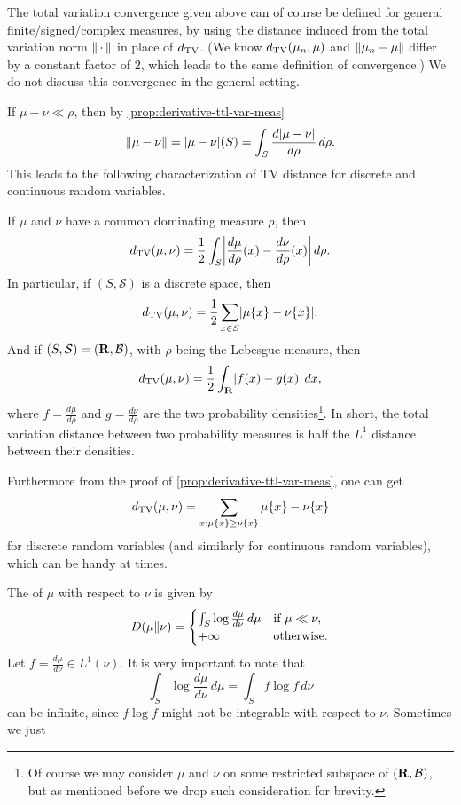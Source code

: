 The total variation convergence given above can of course be defined for general finite/signed/complex measures, by using the distance induced from the total variation norm $\lVert \,\cdot\, \rVert$ in place of $d_{\mathrm{TV}}$. (We know $d_{\mathrm{TV}}(\mu_n,\mu)$ and $\lVert \mu_n-\mu \rVert$ differ by a constant factor of $2$, which leads to the same definition of convergence.) We do not discuss this convergence in the general setting.


If $\mu - \nu \ll \rho$, then by \cref{prop:derivative-ttl-var-meas} \[\lVert \mu - \nu \rVert = \lvert \mu - \nu \rvert(S) = \int_S\frac{d\lvert \mu - \nu \rvert}{d\rho}\,d\rho.\] This leads to the following characterization of TV distance for discrete and continuous random variables.
\begin{fact}
    If $\mu$ and $\nu$ have a common dominating measure $\rho$, then \begin{equation}
        \tv(\mu,\nu) = \frac{1}{2} \int_{S} \biggl\vert\frac{d\mu}{d\rho}(x) - \frac{d\nu}{d\rho}(x)\biggr\vert\,d\rho. \label{eq:tv-dominating-expression}
    \end{equation}
    In particular, if $(S,\mathcal S)$ is a discrete space, then \[d_{\mathrm{TV}}(\mu,\nu) = \frac{1}{2}\sum_{x \in S} \lvert \mu\{x\} - \nu\{x\} \rvert.\] And if $(S,\mathcal S) = (\mathbf{R},\mathcal{B})$, with $\rho$ being the Lebesgue measure, then \[d_{\mathrm{TV}}(\mu,\nu) = \frac{1}{2}\int_{\mathbf{R}} \lvert f(x) - g(x) \rvert \,dx,\] where $f = \frac{d\mu}{d\rho}$ and $g = \frac{d\nu}{d\rho}$ are the two probability densities\footnote{Of course we may consider $\mu$ and $\nu$ on some restricted subspace of $(\mathbf{R},\mathcal{B})$, but as mentioned before we drop such consideration for brevity.}. In short, the total variation distance between two probability measures is half the $L^1$ distance between their densities.
\end{fact}

    Furthermore from the proof of \cref{prop:derivative-ttl-var-meas}, one can get \[
        d_{\mathrm{TV}}(\mu,\nu) = \sum_{x: \mu\{x\} \geq \nu\{x\}} \mu\{x\} - \nu\{x\} 
    \] for discrete random variables (and similarly for continuous random variables), which can be handy at times.

The  of $\mu$ with respect to $\nu$ is given by \[
    D(\mu\Vert \nu) = \begin{cases}
        \int_{S} \log\frac{d\mu}{d\nu}\,d\mu & \text{if } \mu \ll \nu,\\
        +\infty & \text{otherwise}.
    \end{cases}
\]
Let $f = \frac{d\mu}{d\nu} \in L^1(\nu)$. It is very important to note that \[\int_S \log\frac{d\mu}{d\nu} \,d\mu = \int_S f\log f\,d\nu\] can be infinite, since $f \log f$ might not be integrable with respect to $\nu$. Sometimes we just 

